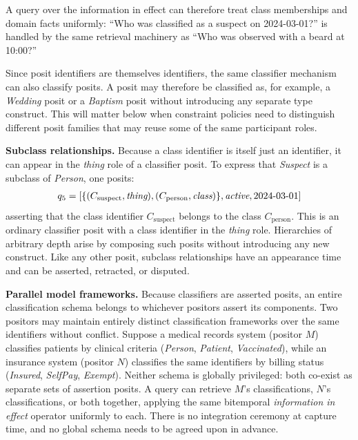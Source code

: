 \documentclass[a4paper,fleqn]{cas-sc}
\begin{document}
A query over the information in effect can therefore treat class memberships and domain facts uniformly: ``Who was classified as a suspect on 2024-03-01?'' is handled by the same retrieval machinery as ``Who was observed with a beard at 10:00?''

Since posit identifiers are themselves identifiers, the same classifier mechanism can also classify posits. A posit may therefore be classified as, for example, a \textit{Wedding} posit or a \textit{Baptism} posit without introducing any separate type construct. This will matter below when constraint policies need to distinguish different posit families that may reuse some of the same participant roles.

\textbf{Subclass relationships.}
Because a class identifier is itself just an identifier, it can appear in the \textit{thing} role of a classifier posit. To express that \textit{Suspect} is a subclass of \textit{Person}, one posits:
\begin{align*}
q_{5} = [\{(C_{\mathrm{suspect}}, \textit{thing}), (C_{\mathrm{person}}, \textit{class})\}, \textit{active}, \textrm{2024\text{-}03\text{-}01}]
\end{align*}
asserting that the class identifier $C_{\mathrm{suspect}}$ belongs to the class $C_{\mathrm{person}}$. This is an ordinary classifier posit with a class identifier in the \textit{thing} role. Hierarchies of arbitrary depth arise by composing such posits without introducing any new construct. Like any other posit, subclass relationships have an appearance time and can be asserted, retracted, or disputed.

\textbf{Parallel model frameworks.}
Because classifiers are asserted posits, an entire classification schema belongs to whichever positors assert its components. Two positors may maintain entirely distinct classification frameworks over the same identifiers without conflict. Suppose a medical records system (positor $M$) classifies patients by clinical criteria (\textit{Person}, \textit{Patient}, \textit{Vaccinated}), while an insurance system (positor $N$) classifies the same identifiers by billing status (\textit{Insured}, \textit{SelfPay}, \textit{Exempt}). Neither schema is globally privileged: both co-exist as separate sets of assertion posits. A query can retrieve $M$'s classifications, $N$'s classifications, or both together, applying the same bitemporal \emph{information in effect} operator uniformly to each. There is no integration ceremony at capture time, and no global schema needs to be agreed upon in advance.
\end{document}
